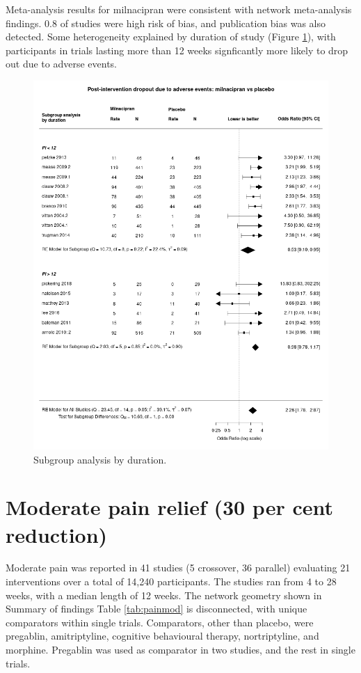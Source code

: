 \documentclass{report}\usepackage[]{graphicx}\usepackage[]{color}
\begin{document}
Meta-analysis results for milnacipran were consistent with network meta-analysis findings. 0.8 of studies were high risk of bias, and publication bias was also detected. Some heterogeneity explained by duration of study (Figure \ref{fig:dropout-duration-milna-plac}), with participants in trials lasting more than 12 weeks signficantly more likely to drop out due to adverse events.

\begin{figure}
\includegraphics[width = \textwidth]{img/adverse_dropout-duration-milnacipran-placebo-forest.png}
\caption[Dropout by duration, milnacipran]{
Subgroup analysis by duration.
}
\label{fig:dropout-duration-milna-plac}
\end{figure}



\section{Moderate pain relief (30 per cent reduction)}

Moderate pain was reported in 41 studies (5 crossover, 36 parallel) evaluating 21 interventions over a total of 14,240 participants. The studies ran from 4 to 28 weeks, with a median length of 12 weeks. The network geometry shown in Summary of findings Table \ref{tab:painmod}  is disconnected, with unique comparators within single trials. Comparators, other than placebo, were pregablin, amitriptyline, cognitive behavioural therapy, nortriptyline, and morphine. Pregablin was used as comparator in two studies, and the rest in single trials.
\end{document}
